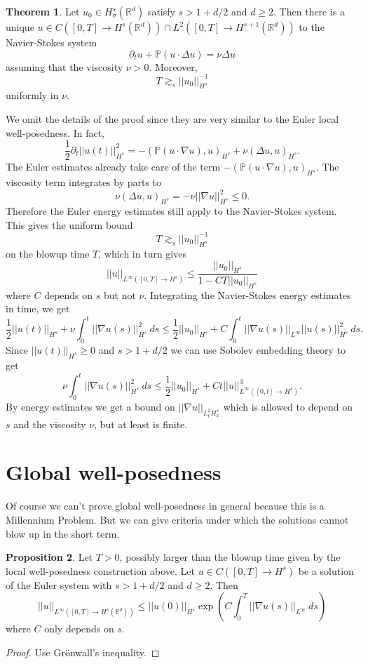\documentclass[12pt]{book}
\newcommand{\RR}{\mathbb{R}}
\newcommand{\PP}{\mathbb{P}}
\theoremstyle{definition}
\newtheorem{theorem}{Theorem}[chapter]
\newtheorem{proposition}[theorem]{Proposition}
\begin{document}
\begin{theorem}
Let $u_0 \in H^s_\sigma(\RR^d)$ satisfy $s > 1 + d/2$ and $d \geq 2$.
Then there is a unique $u \in C([0, T] \to H^s(\RR^d)) \cap L^2([0, T] \to H^{s+1}(\RR^d))$
to the Navier-Stokes system
$$\partial_t u + \PP(u \cdot \Delta u) = \nu \Delta u$$
assuming that the viscosity $\nu > 0$.
Moreover,
$$T \gtrsim_s ||u_0||_{H^s}^{-1}$$
uniformly in $\nu$.
\end{theorem}

We omit the details of the proof since they are very similar to the Euler local well-posedness.
In fact,
$$\frac{1}{2} \partial_t ||u(t)||_{H^s}^2 = -(\PP(u \cdot \nabla u), u)_{H^s} + \nu (\Delta u, u)_{H^s}.$$
The Euler estimates already take care of the term $-(\PP(u \cdot \nabla u), u)_{H^s}$.
The viscosity term integrates by parts to
$$\nu (\Delta u, u)_{H^s} = -\nu ||\nabla u||_{H^s}^2 \leq 0.$$
Therefore the Euler energy estimates still apply to the Navier-Stokes system.
This gives the uniform bound
$$T \gtrsim_s ||u_0||_{H^s}^{-1}$$
on the blowup time $T$, which in turn gives
$$||u||_{L^\infty([0, T] \to H^s)} \leq \frac{||u_0||_{H^s}}{1 - CT||u_0||_{H^s}}$$
where $C$ depends on $s$ but not $\nu$.
Integrating the Navier-Stokes energy estimates in time, we get
$$\frac{1}{2} ||u(t)||_{H^s} + \nu \int_0^t ||\nabla u(s)||_{H^s}^2 ~ds \leq \frac{1}{2} ||u_0||_{H^s} + C \int_0^t ||\nabla u(s)||_{L^\infty} ||u(s)||_{H^s}^2 ~ds.$$
Since $||u(t)||_{H^s} \geq 0$ and $s > 1 + d/2$ we can use Sobolev embedding theory to get
$$\nu \int_0^t ||\nabla u(s)||_{H^s}^2 ~ds \leq \frac{1}{2} ||u_0||_{H^s} + Ct||u||_{L^\infty([0, t] \to H^s)}^3.$$
By energy estimates we get a bound on $||\nabla u||_{L^2_tH^s_x}$ which is allowed to depend on $s$ and the viscosity $\nu$, but at least is finite.

\section{Global well-posedness}
Of course we can't prove global well-posedness in general because this is a Millennium Problem.
But we can give criteria under which the solutions cannot blow up in the short term.

\begin{proposition}
Let $T > 0$, possibly larger than the blowup time given by the local well-posedness construction above.
Let $u \in C([0, T] \to H^s)$ be a solution of the Euler system with $s > 1 + d/2$ and $d \geq 2$.
Then
$$||u||_{L^\infty([0, T] \to H^s(\RR^d))} \leq ||u(0)||_{H^s} \exp\left(C \int_0^T ||\nabla u(s)||_{L^\infty} ~ds\right)$$
where $C$ only depends on $s$.
\end{proposition}
\begin{proof}
Use Gr\"onwall's inequality.
\end{proof}
\end{document}
